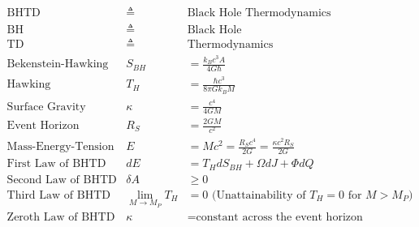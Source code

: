 \begin{equation*}
\displaystyle \begin{array}{lll}
\text{BHTD} & \triangleq & \text{Black Hole Thermodynamics} \\ \text{BH} & \triangleq & \text{Black Hole} \\ \text{TD} & \triangleq & \text{Thermodynamics} \\ \text{Bekenstein-Hawking Entropy} & S_{BH} & = \frac{k_B c^3 A}{4G\hbar} \\ \text{Hawking Temperature} & T_H & = \frac{\hbar c^3}{8\pi G k_B M} \\ \text{Surface Gravity} & \kappa & = \frac{c^4}{4GM} \\ \text{Event Horizon} & R_S & = \frac{2GM}{c^2} \\ \text{Mass-Energy-Tension} & E & = Mc^2 = \frac{R_S c^4}{2G} = \frac{\kappa c^2 R_S}{2G} \\ \text{First Law of BHTD} & dE & = T_H dS_{BH} + \Omega dJ + \Phi dQ \\ \text{Second Law of BHTD} & \delta A & \geq 0 \\ \text{Third Law of BHTD} & \lim_{M\to M_P} T_H & = 0 \text{ (Unattainability of } T_H=0 \text{ for } M>M_P \text{)} \\ \text{Zeroth Law of BHTD} & \kappa & = \text{constant across the event horizon} \end{array}
\end{equation*}